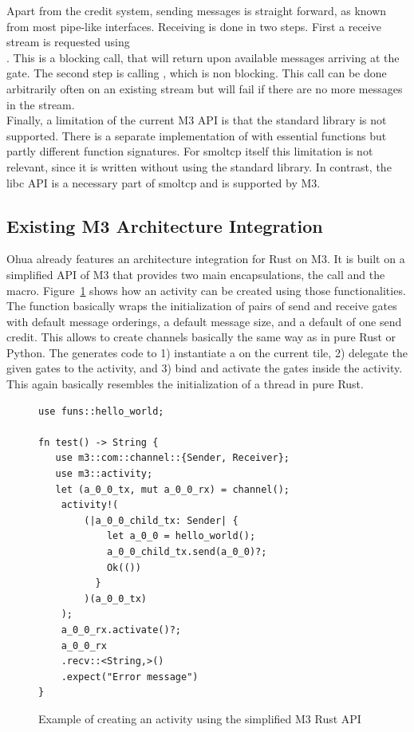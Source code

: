 Apart from the credit system, sending messages is straight forward, as known from most pipe-like interfaces. Receiving is done in two steps. First a receive stream is requested using \\
. This is a blocking call, that will return upon available messages arriving at the gate. The second step is calling , which is non blocking. This call can be done arbitrarily often on an existing stream but will fail if there are no more messages in the stream.\\

Finally, a limitation of the current M3 API is that the standard library is not supported. There is a separate implementation of  with essential functions but partly different function signatures. For smoltcp itself this limitation is not relevant, since it is written without using the standard library. In contrast, the libc API is a necessary part of smoltcp and is supported by M3. 

\subsection{Existing M3 Architecture Integration}
Ohua already features an architecture integration for Rust on M3. It is built on a simplified API of M3 that provides two main encapsulations, the  call and the  macro. Figure~\ref{fig:OhuaM3Wrapper} shows how an activity can be created using those functionalities. The function  basically wraps the initialization of pairs of send and receive gates with default message orderings, a default message size, and a default of one send credit. This allows to create channels basically the same way as in pure Rust or Python. The  generates code to 1) instantiate a  on the current tile, 2) delegate the given gates to the activity, and 3) bind and activate the gates inside the activity. This again basically resembles the initialization of a thread in pure Rust. 


\begin{figure}
    \centering
    \begin{verbatim}
use funs::hello_world;

fn test() -> String {
   use m3::com::channel::{Sender, Receiver};
   use m3::activity;
   let (a_0_0_tx, mut a_0_0_rx) = channel(); 
    activity!(
        (|a_0_0_child_tx: Sender| {    
            let a_0_0 = hello_world();
            a_0_0_child_tx.send(a_0_0)?;
            Ok(())
          }
        )(a_0_0_tx)
    );
    a_0_0_rx.activate()?;
    a_0_0_rx
    .recv::<String,>()
    .expect("Error message")
}

    \end{verbatim}
    \caption{Example of creating an activity using the simplified M3 Rust API}
    \label{fig:OhuaM3Wrapper}
\end{figure}

